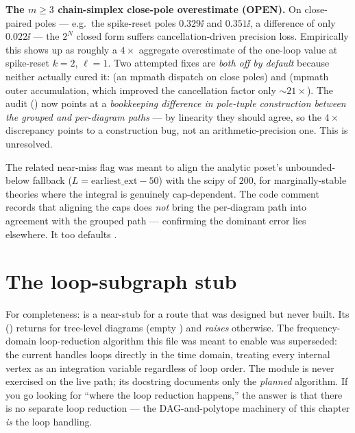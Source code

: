 \begin{gotcha}
\textbf{The $m\ge 3$ chain-simplex close-pole overestimate (OPEN).} On
close-paired poles --- e.g.\ the spike-reset poles $0.329\ii$ and $0.351\ii$, a
difference of only $0.022\ii$ --- the $2^N$ closed form suffers
cancellation-driven precision loss. Empirically this shows up as roughly a
$4\times$ aggregate overestimate of the one-loop value at spike-reset $k=2$,
$\ell=1$. Two attempted fixes are \emph{both off by default} because neither
actually cured it:  (an mpmath dispatch
on close poles) and  (mpmath outer
accumulation, which improved the cancellation factor only $\sim 21\times$). The
audit () now points at a
\emph{bookkeeping difference in pole-tuple construction between the grouped and
per-diagram paths} --- by linearity they should agree, so the $4\times$ discrepancy
points to a construction bug, not an arithmetic-precision one. This is
unresolved.
\end{gotcha}

The related near-miss flag  was meant to align
the analytic poset's unbounded-below fallback ($L = \text{earliest\_ext} - 50$)
with the scipy  of $200$, for marginally-stable theories where
the integral is genuinely cap-dependent. The code comment records that aligning
the caps does \emph{not} bring the per-diagram path into agreement with the
grouped path --- confirming the dominant error lies elsewhere. It too defaults
.

\section{The loop-subgraph stub}\label{sec:subgraph}

For completeness:  is a near-stub for a route that was designed
but never built. Its  ()
returns \code{[]} for tree-level diagrams (empty ) and
\emph{raises } otherwise. The frequency-domain
loop-reduction algorithm this file was meant to enable was superseded: the
current  handles loops directly in the time domain,
treating every internal vertex as an integration variable regardless of loop
order. The module is never exercised on the live path; its docstring documents
only the \emph{planned} algorithm. If you go looking for ``where the loop
reduction happens,'' the answer is that there is no separate loop reduction ---
the DAG-and-polytope machinery of this chapter \emph{is} the loop handling.

